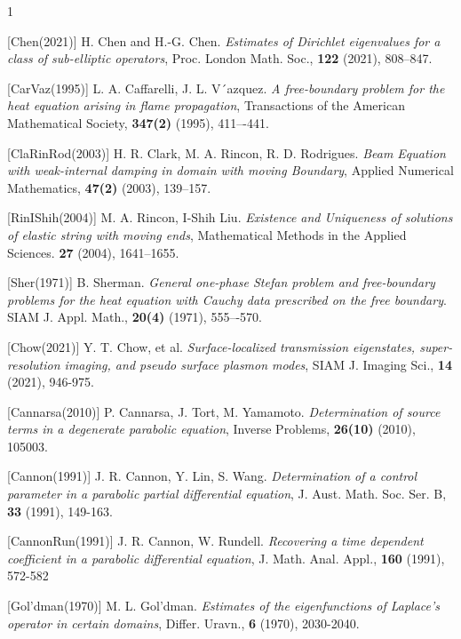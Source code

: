 \documentclass[preprint,12pt,authoryear]{elsarticle}
\begin{document}
\begin{thebibliography}{1}{


[Chen(2021)] H. Chen and H.-G. Chen. \textit{Estimates of Dirichlet eigenvalues for a class of sub-elliptic operators}, Proc. London Math. Soc., \textbf{122} (2021), 808--847.

[CarVaz(1995)] L. A. Caffarelli, J. L. V´azquez. \textit{A free-boundary problem for the heat equation arising in flame propagation}, Transactions of the American Mathematical Society, \textbf{347(2)} (1995), 411–-441.

[ClaRinRod(2003)] H. R. Clark, M. A. Rincon, R. D. Rodrigues. \textit{Beam Equation with weak-internal damping in domain with moving Boundary}, Applied Numerical Mathematics, \textbf{47(2)} (2003), 139--157.

[RinIShih(2004)] M. A. Rincon, I-Shih Liu. \textit{Existence and Uniqueness of solutions of elastic string with moving ends}, Mathematical Methods in the Applied Sciences. \textbf{27} (2004), 1641--1655.

[Sher(1971)] B. Sherman. \textit{General one-phase Stefan problem and free-boundary problems for the heat equation with Cauchy data prescribed on the free boundary}. SIAM J. Appl. Math., \textbf{20(4)} (1971), 555–-570.

[Chow(2021)] Y. T. Chow, et al. \textit{Surface-localized transmission eigenstates, super-resolution imaging, and pseudo surface plasmon modes}, SIAM J. Imaging Sci., \textbf{14} (2021), 946-975.

[Cannarsa(2010)] P. Cannarsa, J. Tort, M. Yamamoto. \textit{Determination of source terms in a degenerate parabolic equation}, Inverse Problems, \textbf{26(10)} (2010), 105003.

[Cannon(1991)] J. R. Cannon, Y. Lin, S. Wang. \textit{Determination of a control parameter in a parabolic partial differential equation}, J. Aust. Math. Soc. Ser. B, \textbf{33} (1991), 149-163.

[CannonRun(1991)] J. R. Cannon, W. Rundell. \textit{Recovering a time dependent coefficient in a parabolic differential equation}, J. Math. Anal. Appl., \textbf{160} (1991), 572-582

[Gol'dman(1970)] M. L. Gol’dman. \textit{Estimates of the eigenfunctions of Laplace’s operator in certain domains}, Differ. Uravn., \textbf{6} (1970), 2030-2040.

}
\end{thebibliography}
\end{document}

